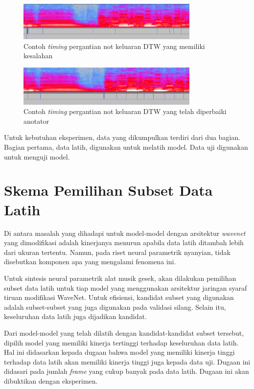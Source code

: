 \begin{figure}[htb]
  \centering
  \includegraphics[width=0.8\textwidth]{resources/DTW-output-example.png}
  \caption{Contoh \textit{timing} pergantian not keluaran DTW yang memiliki kesalahan} \label{dtw-output-example}
\end{figure}

\begin{figure}[htb]
  \centering
  \includegraphics[width=0.8\textwidth]{resources/DTW-output-corrected-example.png}
  \caption{Contoh \textit{timing} pergantian not keluaran DTW yang telah diperbaiki anotator} \label{dtw-output-example-corrected}
\end{figure}

Untuk kebutuhan eksperimen, data yang dikumpulkan terdiri dari dua bagian. Bagian pertama, data latih, digunakan untuk melatih model. Data uji digunakan untuk menguji model.

\section{Skema Pemilihan Subset Data Latih}\label{subsetselectionsection}

Di antara masalah yang dihadapi untuk model-model dengan arsitektur \textit{wavenet} yang dimodifikasi adalah kinerjanya menurun apabila data latih ditambah lebih dari ukuran tertentu. Namun, pada riset neural parametrik nyanyian, tidak disebutkan komponen apa yang mengalami fenomena ini.

Untuk sintesis neural parametrik alat musik gesek, akan dilakukan pemilihan subset data latih untuk tiap model yang menggunakan arsitektur jaringan syaraf tiruan modifikasi WaveNet. Untuk efisiensi, kandidat subset yang digunakan adalah subset-subset yang juga digunakan pada validasi silang. Selain itu, keseluruhan data latih juga dijadikan kandidat.

Dari model-model yang telah dilatih dengan kandidat-kandidat subset tersebut, dipilih model yang memiliki kinerja tertinggi terhadap keseluruhan data latih. Hal ini didasarkan kepada dugaan bahwa model yang memiliki kinerja tinggi terhadap data latih akan memiliki kinerja tinggi juga kepada data uji. Dugaan ini didasari pada jumlah \textit{frame} yang cukup banyak pada data latih. Dugaan ini akan dibuktikan dengan eksperimen.

